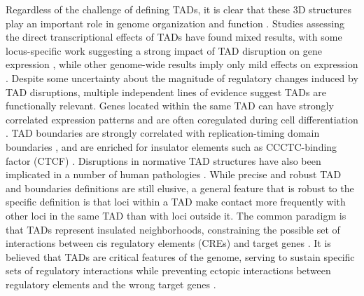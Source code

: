 Regardless of the challenge of defining TADs, it is clear that these 3D structures play an important role in genome organization and function \cite{Berlivet.2013, Dixon.2016, Beagan.2020, Andrey.2017, Franke.2018, Xie.2019, Dixon.2015, Delaneau.2019, Smith.2016}. Studies assessing the direct transcriptional effects of TADs have found mixed results, with some locus-specific work suggesting a strong impact of TAD disruption on gene expression \cite{Lupiáñez.2015, Hnisz.2016, Guo.2015, Laugsch.2019}, while other genome-wide results imply only mild effects on expression \cite{Ghavi-Helm.2019, Zuin.2014, Espinola.2020, Rao.2017}. Despite some uncertainty about the magnitude of regulatory changes induced by TAD disruptions, multiple independent lines of evidence suggest TADs are functionally relevant. Genes located within the same TAD can have strongly correlated expression patterns and are often coregulated during cell differentiation \cite{Nora.2012, Zhan.2017, Ramírez.2018}. TAD boundaries are strongly correlated with replication-timing domain boundaries \cite{Pope.2014}, and are enriched for insulator elements such as CCCTC-binding factor (CTCF) \cite{Dixon.2012, Rao.2014}. Disruptions in normative TAD structures have also been implicated in a number of human pathologies \cite{Lupiáñez.2016, Ibn-Salem.2014, Franke.2016}. While precise and robust TAD and boundaries definitions are still elusive, a general feature that is robust to the specific definition is that loci within a TAD make contact more frequently with other loci in the same TAD than with loci outside it. The common paradigm is that TADs represent insulated neighborhoods, constraining the possible set of interactions between cis regulatory elements (CREs) and target genes \cite{Andrey.2017, Franke.2018, Dixon.2015, Delaneau.2019, Smith.2016, Symmons.2014, Tanay.2013}. It is believed that TADs are critical features of the genome, serving to sustain specific sets of regulatory interactions while preventing ectopic interactions between regulatory elements and the wrong target genes \cite{Andrey.2017, Symmons.2014, Sexton.2015}.

